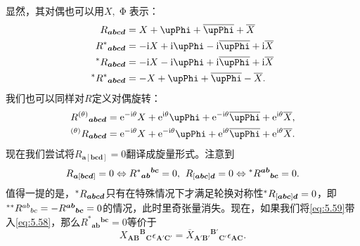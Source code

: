 显然，其对偶也可以用$X,\upPhi $表示：
\begin{equation}
	\begin{aligned}
		R_{\boldsymbol{abcd}} & =X+\upPhi +\overline{\upPhi } +\overline{X}\\
		R^{*}{}_{\boldsymbol{abcd}} & =-\mathrm{i} X+\mathrm{i} \upPhi -\mathrm{i}\overline{\upPhi } +\mathrm{i}\overline{X}\\
		\prescript{*}{}{} R_{\boldsymbol{abcd}} & =-\mathrm{i} X-\mathrm{i} \upPhi +\mathrm{i}\overline{\upPhi } +\mathrm{i}\overline{X}\\
		\prescript{*}{}{} R^{*}{}_{\boldsymbol{abcd}} & =-X+\upPhi +\overline{\upPhi } -\overline{X} .
	\end{aligned}
	\label{eq:5.58}
\end{equation}
我们也可以同样对$R$定义对偶旋转：
\begin{equation*}
	\begin{aligned}
		R^{( \theta )}{}_{\boldsymbol{abcd}} & =\mathrm{e}^{-\mathrm{i} \theta } X+\mathrm{e}^{\mathrm{i} \theta } \upPhi +\mathrm{e}^{-\mathrm{i} \theta }\overline{\upPhi } +\mathrm{e}^{\mathrm{i} \theta }\overline{X} ,\\
		\prescript{( \theta )}{}{} R_{\boldsymbol{abcd}} & =\mathrm{e}^{-\mathrm{i} \theta } X+\mathrm{e}^{-\mathrm{i} \theta } \upPhi +\mathrm{e}^{\mathrm{i} \theta }\overline{\upPhi } +\mathrm{e}^{\mathrm{i} \theta }\overline{X} .
	\end{aligned}
\end{equation*}
现在我们尝试将$R_{\boldsymbol{a}[\boldsymbol{bcd}]} =0$翻译成旋量形式。注意到
\begin{equation}
	R_{\boldsymbol{a}[\boldsymbol{bcd}]} =0\Leftrightarrow R^{*}{}{_{\boldsymbol{ab}}}^{\boldsymbol{bc}} =0,\kern+0.4em R_{[\boldsymbol{abc}]\boldsymbol{d}} =0\Leftrightarrow \prescript{*}{}{} R^{\boldsymbol{ab}}{}_{\boldsymbol{bc}} =0.
	\label{eq:5.59}
\end{equation}
值得一提的是，$\prescript{*}{}{} R_{\boldsymbol{abcd}}$只有在特殊情况下才满足轮换对称性$\prescript{*}{}{} R_{[\boldsymbol{abc}]\boldsymbol{d}} =0$，即$\prescript{**}{}{} R^{ab}{}_{bc} =-R^{\boldsymbol{ab}}{}_{\boldsymbol{bc}} =0$的情况，此时里奇张量消失。现在，如果我们将\ref{eq:5.59}带入\ref{eq:5.58}，那么$R^{*}{}{_{\boldsymbol{ab}}}^{\boldsymbol{bc}} =0$等价于
\begin{equation}
	X{_{\boldsymbol{AB}}}^{\boldsymbol{B}}{}_{\boldsymbol{C}} \epsilon _{\boldsymbol{A} '\boldsymbol{C} '} =\overline{X}{_{\boldsymbol{A} '\boldsymbol{B} '}}^{\boldsymbol{B} '}{}_{\boldsymbol{C} '} \epsilon _{\boldsymbol{AC}} .
	\label{eq:5.60}
\end{equation}
